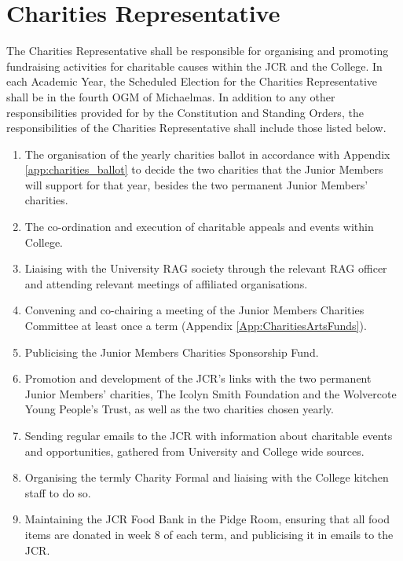 \section{Charities Representative}
\npara The Charities Representative shall be responsible for organising and promoting fundraising activities for charitable causes within the JCR and the College.
\npara In each Academic Year, the Scheduled Election for the Charities Representative shall be in the fourth OGM of Michaelmas.
\npara In addition to any other responsibilities provided for by the Constitution and Standing Orders, the responsibilities of the Charities Representative shall include those listed below.
\begin{enumerate}
	\item The organisation of the yearly charities ballot in accordance with Appendix \ref{app:charities_ballot} to decide the two charities that the Junior Members will support for that year, besides the two permanent Junior Members' charities.
	\item The co-ordination and execution of charitable appeals and events within College.
	\item Liaising with the University RAG society through the relevant RAG officer and attending relevant meetings of affiliated organisations.
	\item Convening and co-chairing a meeting of the Junior Members Charities Committee at least once a term (Appendix \ref{App:CharitiesArtsFunds}).
	\item Publicising the Junior Members Charities Sponsorship Fund.
	\item Promotion and development of the JCR's links with the two permanent Junior Members' charities, The Icolyn Smith Foundation and the Wolvercote Young People's Trust, as well as the two charities chosen yearly.     
	\item Sending regular emails to the JCR with information about charitable events and opportunities, gathered from University and College wide sources.
	\item Organising the termly Charity Formal and liaising with the College kitchen staff to do so.
	\item Maintaining the JCR Food Bank in the Pidge Room, ensuring that all food items are donated in week 8 of each term, and publicising it in emails to the JCR.
\end{enumerate}

